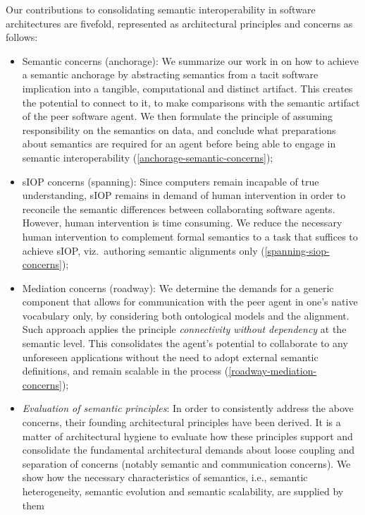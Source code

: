 \documentclass[sort&compress,preprint,authoryear,3p,twocolumn]{elsarticle}
\providecommand{\tightlist}{%
  \setlength{\itemsep}{0pt}\setlength{\parskip}{0pt}}
\begin{document}
Our contributions to consolidating semantic interoperability in software
architectures are fivefold, represented as architectural principles and
concerns as follows:

\begin{itemize}
\tightlist
\item
  Semantic concerns (anchorage): We summarize our work in
  \citep{Brandt2021a} on how to achieve a semantic anchorage by
  abstracting semantics from a tacit software implication into a
  tangible, computational and distinct artifact. This creates the
  potential to connect to it, to make comparisons with the semantic
  artifact of the peer software agent. We then formulate the principle
  of assuming responsibility on the semantics on data, and conclude what
  preparations about semantics are required for an agent before being
  able to engage in semantic interoperability
  (\cref{anchorage-semantic-concerns});
\item
  sIOP concerns (spanning): Since computers remain incapable of true
  understanding, sIOP remains in demand of human intervention in order
  to reconcile the semantic differences between collaborating software
  agents. However, human intervention is time consuming. We reduce the
  necessary human intervention to complement formal semantics to a task
  that suffices to achieve sIOP, viz.~authoring semantic alignments only
  (\cref{spanning-siop-concerns});
\item
  Mediation concerns (roadway): We determine the demands for a generic
  component that allows for communication with the peer agent in one's
  native vocabulary only, by considering both ontological models and the
  alignment. Such approach applies the principle \emph{connectivity
  without dependency} at the semantic level. This consolidates the
  agent's potential to collaborate to any unforeseen applications
  without the need to adopt external semantic definitions, and remain
  scalable in the process (\cref{roadway-mediation-concerns});
\item
  \emph{Evaluation of semantic principles}: In order to consistently
  address the above concerns, their founding architectural principles
  have been derived. It is a matter of architectural hygiene to evaluate
  how these principles support and consolidate the fundamental
  architectural demands about loose coupling and separation of concerns
  (notably semantic and communication concerns). We show how the
  necessary characteristics of semantics, i.e., semantic heterogeneity,
  semantic evolution and semantic scalability, are supplied by them

\end{itemize}
\end{document}
